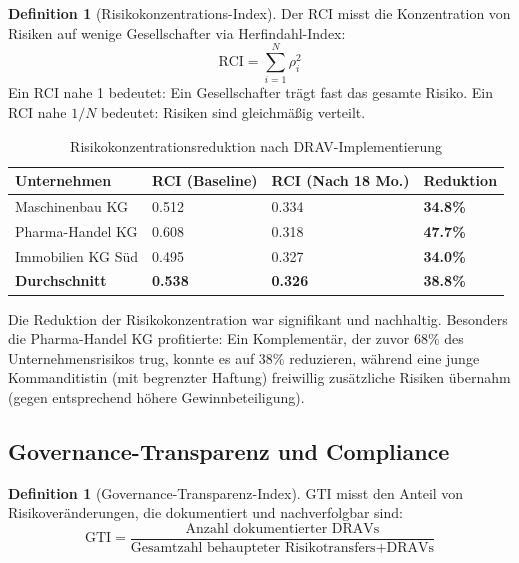 \documentclass[a4paper, 12pt, twoside, openright]{report}
\theoremstyle{definition}
\newtheorem{definition}[theorem]{Definition}
\theoremstyle{definition}
\begin{document}
\begin{definition}[Risikokonzentrations-Index]
Der RCI misst die Konzentration von Risiken auf wenige Gesellschafter via Herfindahl-Index:
\begin{equation}
\text{RCI} = \sum_{i=1}^N \rho_i^2
\end{equation}
Ein RCI nahe 1 bedeutet: Ein Gesellschafter trägt fast das gesamte Risiko. Ein RCI nahe $1/N$ bedeutet: Risiken sind gleichmäßig verteilt.
\end{definition}

\begin{table}[H]
\centering
\caption{Risikokonzentrationsreduktion nach DRAV-Implementierung}
\label{tab:rci_results}
\begin{tabular}{@{}llll@{}}
\toprule
\textbf{Unternehmen} & \textbf{RCI (Baseline)} & \textbf{RCI (Nach 18 Mo.)} & \textbf{Reduktion} \\
\midrule
Maschinenbau KG & 0.512 & 0.334 & \textbf{34.8\%} \\
Pharma-Handel KG & 0.608 & 0.318 & \textbf{47.7\%} \\
Immobilien KG Süd & 0.495 & 0.327 & \textbf{34.0\%} \\
\midrule
\textbf{Durchschnitt} & \textbf{0.538} & \textbf{0.326} & \textbf{38.8\%} \\
\bottomrule
\end{tabular}
\end{table}

Die Reduktion der Risikokonzentration war signifikant und nachhaltig. Besonders die Pharma-Handel KG profitierte: Ein Komplementär, der zuvor 68\% des Unternehmensrisikos trug, konnte es auf 38\% reduzieren, während eine junge Kommanditistin (mit begrenzter Haftung) freiwillig zusätzliche Risiken übernahm (gegen entsprechend höhere Gewinnbeteiligung).

\subsection{Governance-Transparenz und Compliance}

\begin{definition}[Governance-Transparenz-Index]
GTI misst den Anteil von Risikoveränderungen, die dokumentiert und nachverfolgbar sind:
\begin{equation}
\text{GTI} = \frac{\text{Anzahl dokumentierter DRAVs}}{\text{Gesamtzahl behaupteter Risikotransfers} + \text{DRAVs}}
\end{equation}
\end{definition}
\end{document}
